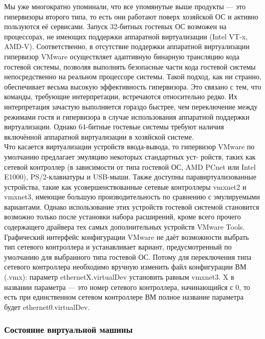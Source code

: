 \documentclass[14pt, a4paper]{article}
\begin{document}
Мы уже многократно упоминали, что все упомянутые выше продукты — это гипервизоры второго типа,
то есть они работают поверх хозяйской ОС и активно пользуются её сервисами. Запуск 32-битных
гостевых ОС возможен на процессорах, не имеющих поддержки аппаратной виртуализации (Intel VT-x,
AMD-V). Соответственно, в отсутствие поддержки аппаратной виртуализации гипервизор VMware
осуществляет адаптивную бинарную трансляцию кода гостевой системы, позволяя выполнять
безопасные части кода гостевой системы непосредственно на реальном процессоре системы. Такой
подход, как ни странно, обеспечивает весьма высокую эффективность гипервизора. Это связано с
тем, что команды, требующие интерпретации, встречаются относительно редко. Их интерпретация
зачастую выполняется гораздо быстрее, чем переключение между режимами гостя и гипервизора в
случае использования аппаратной поддержки виртуализации. Однако 64-битные гостевые системы
требуют наличия включённой аппаратной виртуализации в хозяйской системе.\\

Что касается виртуализации устройств ввода-вывода, то гипервизор VMware по умолчанию
предлагает эмуляцию некоторых стандартных уст- ройств, таких как сетевой контроллер (в зависимости
от типа гостевой ОС, AMD PCnet или Intel E1000), PS/2-клавиатуры и USB-мыши. Также доступны
паравиртуализованные устройства, такие как усовершенствованные сетевые контроллеры vmxnet2 и
vmxnet3, имеющие большую производительность по сравнению с эмулируемыми вариантами. Однако
использование этих устройств гостевой системой становится возможно только после установки
набора расширений, кроме всего прочего содержащего драйвера тех самых дополнительных
устройств VMware Tools.\\

Графический интерфейс конфигурации VMware не даёт возможности выбрать тип сетевого
контроллера и устанавливает вариант, предусмотренный по умолчанию для выбранного типа гостевой
ОС. Потому для переключения типа сетевого контроллера необходимо вручную изменить файл
конфигурации ВМ (.vmx): параметр ethernetX.virtualDev установить равным vmxnet3. X в
названии параметра — это номер сетевого контроллера, начинающийся с 0, то есть при единственном
сетевом контроллере ВМ полное название параметра будет ethernet0.virtualDev.

\subsubsection*{Состояние виртуальной машины}
\end{document}
